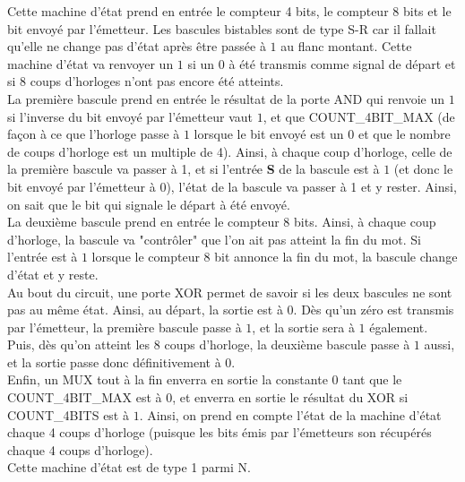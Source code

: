 \documentclass[a4paper]{article} %
\begin{document}
\begin{tcolorbox}[colframe=Monokaimagenta,colback=white]
Cette machine d'état prend en entrée le compteur 4 bits, le compteur 8 bits et le bit envoyé par l'émetteur. Les bascules bistables sont de type S-R car il fallait qu'elle ne change pas d'état après être passée à $1$ au flanc montant. Cette machine d'état va renvoyer un $1$ si un $0$ à été transmis comme signal de départ et si 8 coups d'horloges n'ont pas encore été atteints.\\
La première bascule prend en entrée le résultat de la porte AND qui renvoie un $1$ si l'inverse du bit envoyé par l'émetteur vaut $1$, et que COUNT\_4BIT\_MAX (de façon à ce que l'horloge passe à $1$ lorsque le bit envoyé est un $0$ et que le nombre de coups d'horloge est un multiple de 4). Ainsi, à chaque coup d'horloge, celle de la première bascule va passer à 1, et si l'entrée \textbf{S} de la bascule est à $1$ (et donc le bit envoyé par l'émetteur à $0$), l'état de la bascule va passer à 1 et y rester. Ainsi, on sait que le bit qui signale le départ à été envoyé.\\
La deuxième bascule prend en entrée le compteur 8 bits. Ainsi, à chaque coup d'horloge, la bascule va "contrôler" que l'on ait pas atteint la fin du mot. Si l'entrée est à $1$ lorsque le compteur 8 bit annonce la fin du mot, la bascule change d'état et y reste.\\
Au bout du circuit, une porte XOR permet de savoir si les deux bascules ne sont pas au même état.
Ainsi, au départ, la sortie est à 0. Dès qu'un zéro est transmis par l'émetteur, la première bascule passe à $1$, et la sortie sera à $1$ également. Puis, dès qu'on atteint les 8 coups d'horloge, la deuxième bascule passe à $1$ aussi, et la sortie passe donc définitivement à $0$.\\
Enfin, un MUX tout à la fin enverra en sortie la constante $0$ tant que le COUNT\_4BIT\_MAX est à $0$, et enverra en sortie le résultat du XOR si COUNT\_4BITS est à $1$. Ainsi, on prend en compte l'état de la machine d'état chaque 4 coups d'horloge (puisque les bits émis par l'émetteurs son récupérés chaque 4 coups d'horloge).\\
Cette machine d'état est de type 1 parmi N.
\end{tcolorbox}
\end{document}
